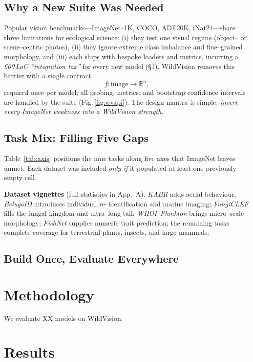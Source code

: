 \documentclass{article}
\newcommand{\benchmarkname}{WildVision}
\begin{document}
\subsection{Why a New Suite Was Needed}
Popular vision benchmarks---ImageNet--1K, COCO, ADE20K, iNat21---share three
limitations for ecological science: (i) they test one visual regime
(object-- or scene--centric photos), (ii) they ignore extreme class
imbalance and fine–grained morphology, and (iii) each ships with bespoke
loaders and metrics, incurring a \emph{600\,LoC “integration tax”} for every
new model (§1).  
WildVision removes this barrier with a single contract  
\[
  \boxed{f:\text{image}\rightarrow\mathbb{R}^{n}},
\]
required once per model; all probing, metrics, and
bootstrap confidence intervals are handled by the suite (Fig.\,\ref{fig:wvapi}).
The design mantra is simple: \emph{invert every ImageNet weakness into a
WildVision strength.}

\subsection{Task Mix: Filling Five Gaps}
Table~\ref{tab:axis} positions the nine tasks along five axes that ImageNet
leaves unmet.  Each dataset was included \emph{only if} it populated at least
one previously empty cell.


\noindent\textbf{Dataset vignettes} (full statistics in App.~A).  
\textit{KABR} adds aerial behaviour;  
\textit{BelugaID} introduces individual re–identification and marine imaging;  
\textit{FungiCLEF} fills the fungal kingdom and ultra–long tail;  
\textit{WHOI–Plankton} brings micro–scale morphology;  
\textit{FishNet} supplies numeric trait prediction;  
the remaining tasks complete coverage for terrestrial plants, insects,
and large mammals.

\subsection{Build Once, Evaluate Everywhere}

\section{Methodology}

We evaluate XX models on \benchmarkname{}.


\section{Results}
\end{document}
